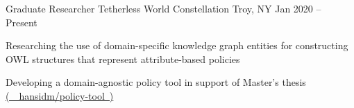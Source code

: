 
\begin{cventries}

  \cventry
  {Graduate Researcher}
  {Tetherless World Constellation}
  {Troy, NY}
  {Jan 2020 -- Present}
  {
    \begin{cvitems}
      \item {
                  Researching the use of domain-specific knowledge graph entities for constructing OWL structures that represent attribute-based policies
            }
      \item {
                  Developing a domain-agnostic policy tool in support of Master's thesis \href{https://github.com/hansidm/policy_tool}{(\ \faGithubSquare\  hansidm/policy-tool\ )}
            }
    \end{cvitems}
  }
\end{cventries}
